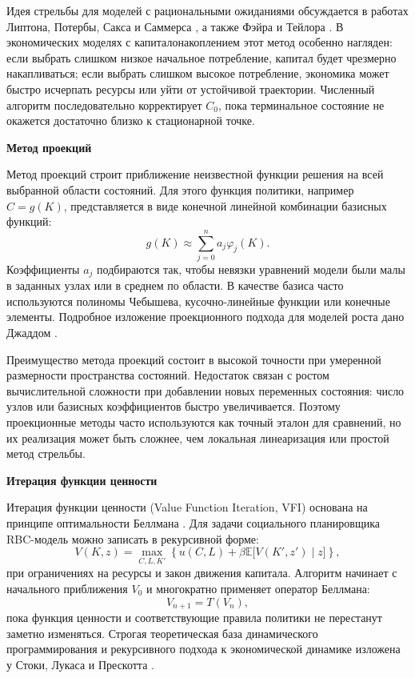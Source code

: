 Идея стрельбы для моделей с рациональными ожиданиями обсуждается в работах
Липтона, Потербы, Сакса и Саммерса \cite{lipton1983multiple}, а также Фэйра и
Тейлора \cite{fairtaylor1983solution}. В экономических моделях с
капиталонакоплением этот метод особенно нагляден: если выбрать слишком низкое
начальное потребление, капитал будет чрезмерно накапливаться; если выбрать
слишком высокое потребление, экономика может быстро исчерпать ресурсы или уйти
от устойчивой траектории. Численный алгоритм последовательно корректирует
$C_0$, пока терминальное состояние не окажется достаточно близко к
стационарной точке.

\medskip
\noindent\textbf{Метод проекций}
\par\smallskip

Метод проекций строит приближение неизвестной функции решения на всей выбранной
области состояний. Для этого функция политики, например $C=g(K)$, представляется
в виде конечной линейной комбинации базисных функций:
\[
    g(K)
    \approx
    \sum_{j=0}^{n} a_j \varphi_j(K).
\]
Коэффициенты $a_j$ подбираются так, чтобы невязки уравнений модели были малы в
заданных узлах или в среднем по области. В качестве базиса часто используются
полиномы Чебышева, кусочно-линейные функции или конечные элементы. Подробное
изложение проекционного подхода для моделей роста дано Джаддом
\cite{judd1992projection, judd1998numerical}.

Преимущество метода проекций состоит в высокой точности при умеренной
размерности пространства состояний. Недостаток связан с ростом вычислительной
сложности при добавлении новых переменных состояния: число узлов или базисных
коэффициентов быстро увеличивается. Поэтому проекционные методы часто
используются как точный эталон для сравнений, но их реализация может быть
сложнее, чем локальная линеаризация или простой метод стрельбы.

\medskip
\noindent\textbf{Итерация функции ценности}
\par\smallskip

Итерация функции ценности (Value Function Iteration, VFI) основана на принципе
оптимальности Беллмана \cite{bellman1957dynamic}. Для задачи социального
планировщика RBC-модель можно записать в рекурсивной форме:
\[
    V(K,z)
    =
    \max_{C,L,K'}
    \left\{
        u(C,L)
        +
        \beta \mathbb{E}\bigl[V(K',z') \mid z\bigr]
    \right\},
\]
при ограничениях на ресурсы и закон движения капитала. Алгоритм начинает с
начального приближения $V_0$ и многократно применяет оператор Беллмана:
\[
    V_{n+1}=T(V_n),
\]
пока функция ценности и соответствующие правила политики не перестанут заметно
изменяться. Строгая теоретическая база динамического программирования и
рекурсивного подхода к экономической динамике изложена у Стоки, Лукаса и
Прескотта \cite{stokey1989recursive}.

